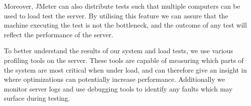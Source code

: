 Moreover, JMeter can also distribute tests such that multiple computers can be used to load test the server.
By utilising this feature we can assure that the machine executing the test is not the bottleneck, and the outcome of any test will reflect the performance of the server.

\bigskip
To better understand the results of our system and load tests, we use various profiling tools on the server.
These tools are capable of measuring which parts of the system are most critical when under load, and can therefore give an insight in where optimizations can potentially increase performance.
Additionally we monitor server logs and use debugging tools to identify any faults which may surface during testing.

